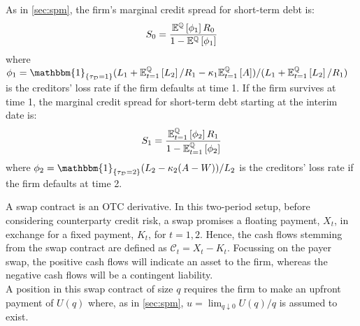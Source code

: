 \documentclass[main.tex]{subfiles}
\begin{document}
        As in \cref{sec:spm}, the firm's marginal credit spread for short-term debt is:
        \begin{equation}
            S_0 =
            \frac{
                \mathbb{E}^{\mathbb{Q}}\left[\phi_1\right]R_0
            }{
                1 - \mathbb{E}^{\mathbb{Q}}\left[\phi_1\right] 
            }
        \end{equation}
        where
        $\phi_1 = \mathbbm{1}_{\{\tau_{\mathcal{D}}=1\}} (L_{1}+\mathbb{E}_{t=1}^{\rnmeasure}\left[L_{2}\right]/R_1 - \kappa_{1}\mathbb{E}_{t=1}^{\rnmeasure}\left[A\right]) / (L_{1} + \mathbb{E}_{t=1}^{\rnmeasure}\left[L_{2}\right]/R_1)$ is the creditors' loss rate if the firm defaults at time 1. If the firm survives at time 1, the marginal credit spread for short-term debt starting at the interim date is:
        \begin{equation}
            S_1 =
            \frac{
                \mathbb{E}_{t=1}^{\mathbb{Q}}\left[\phi_2\right]R_1
            }{
                1 - \mathbb{E}_{t=1}^{\mathbb{Q}}\left[\phi_2\right] 
            }
        \end{equation}
        where $\phi_2 = \mathbbm{1}_{\{\tau_{\mathcal{D}}=2\}} (L_{2}-\kappa_{2}(A-W))/L_{2}$ is the creditors' loss rate if the firm defaults at time 2.

        A swap contract is an OTC derivative.
        In this two-period setup, before considering counterparty credit risk, a swap promises a floating payment, $X_t$, in exchange for a fixed payment, $K_t$, for $t = 1,2$.
        Hence, the cash flows stemming from the swap contract are defined as $\mathcal{C}_t = X_t - K_t$.
        Focussing on the payer swap, the positive cash flows will indicate an asset to the firm, whereas the negative cash flows will be a contingent liability.
        \\
        A position in this swap contract of size $q$ requires the firm to make an upfront payment of $U(q)$ where, as in \cref{sec:spm}, $u = \lim_{q \downarrow 0} U(q)/q$ is assumed to exist.
\end{document}
